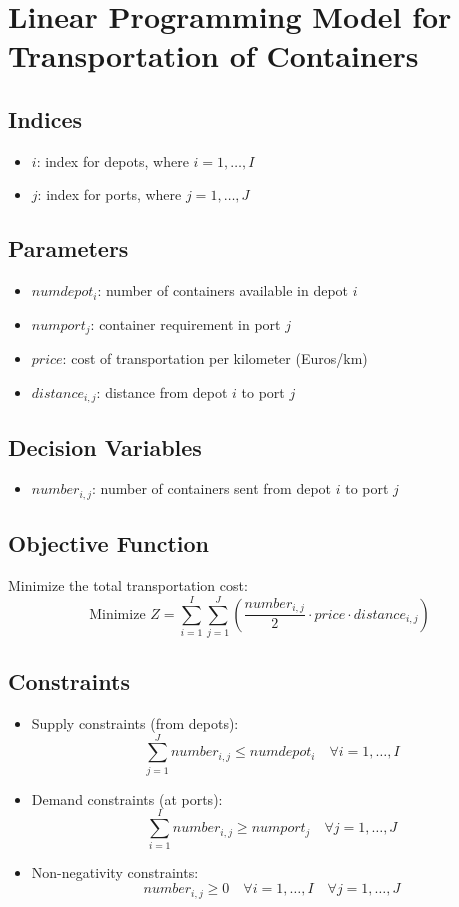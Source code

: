 \documentclass{article}
\begin{document}
\section*{Linear Programming Model for Transportation of Containers}

\subsection*{Indices}
\begin{itemize}
    \item $i$: index for depots, where $i = 1, \ldots, I$
    \item $j$: index for ports, where $j = 1, \ldots, J$
\end{itemize}

\subsection*{Parameters}
\begin{itemize}
    \item $numdepot_i$: number of containers available in depot $i$
    \item $numport_j$: container requirement in port $j$
    \item $price$: cost of transportation per kilometer (Euros/km)
    \item $distance_{i,j}$: distance from depot $i$ to port $j$
\end{itemize}

\subsection*{Decision Variables}
\begin{itemize}
    \item $number_{i,j}$: number of containers sent from depot $i$ to port $j$
\end{itemize}

\subsection*{Objective Function}
Minimize the total transportation cost:
\[
\text{Minimize } Z = \sum_{i=1}^{I} \sum_{j=1}^{J} \left( \frac{number_{i,j}}{2} \cdot price \cdot distance_{i,j} \right)
\]

\subsection*{Constraints}
\begin{itemize}
    \item Supply constraints (from depots):
    \[
    \sum_{j=1}^{J} number_{i,j} \leq numdepot_i \quad \forall i = 1, \ldots, I
    \]

    \item Demand constraints (at ports):
    \[
    \sum_{i=1}^{I} number_{i,j} \geq numport_j \quad \forall j = 1, \ldots, J
    \]

    \item Non-negativity constraints:
    \[
    number_{i,j} \geq 0 \quad \forall i = 1, \ldots, I \quad \forall j = 1, \ldots, J
    \]
\end{itemize}
\end{document}
